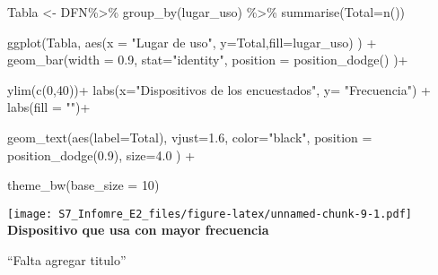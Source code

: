 \documentclass[
]{article}
\newenvironment{Shaded}{\begin{snugshade}}{\end{snugshade}}
\newcommand{\AttributeTok}[1]{\textcolor[rgb]{0.77,0.63,0.00}{#1}}
\newcommand{\DecValTok}[1]{\textcolor[rgb]{0.00,0.00,0.81}{#1}}
\newcommand{\FloatTok}[1]{\textcolor[rgb]{0.00,0.00,0.81}{#1}}
\newcommand{\FunctionTok}[1]{\textcolor[rgb]{0.00,0.00,0.00}{#1}}
\newcommand{\NormalTok}[1]{#1}
\newcommand{\OtherTok}[1]{\textcolor[rgb]{0.56,0.35,0.01}{#1}}
\newcommand{\SpecialCharTok}[1]{\textcolor[rgb]{0.00,0.00,0.00}{#1}}
\newcommand{\StringTok}[1]{\textcolor[rgb]{0.31,0.60,0.02}{#1}}
\begin{document}
\begin{Shaded}
\begin{Highlighting}[]
\NormalTok{Tabla }\OtherTok{\textless{}{-}}\NormalTok{ DFN}\SpecialCharTok{\%\textgreater{}\%} \FunctionTok{group\_by}\NormalTok{(lugar\_uso) }\SpecialCharTok{\%\textgreater{}\%} \FunctionTok{summarise}\NormalTok{(}\AttributeTok{Total=}\FunctionTok{n}\NormalTok{())   }
    
\FunctionTok{ggplot}\NormalTok{(Tabla, }\FunctionTok{aes}\NormalTok{(}\AttributeTok{x =} \StringTok{"Lugar de uso"}\NormalTok{, }\AttributeTok{y=}\NormalTok{Total,}\AttributeTok{fill=}\NormalTok{lugar\_uso) ) }\SpecialCharTok{+}    
  \FunctionTok{geom\_bar}\NormalTok{(}\AttributeTok{width =} \FloatTok{0.9}\NormalTok{, }\AttributeTok{stat=}\StringTok{"identity"}\NormalTok{,              }
           \AttributeTok{position =} \FunctionTok{position\_dodge}\NormalTok{()                 )}\SpecialCharTok{+}  
  
  \FunctionTok{ylim}\NormalTok{(}\FunctionTok{c}\NormalTok{(}\DecValTok{0}\NormalTok{,}\DecValTok{40}\NormalTok{))}\SpecialCharTok{+}
  \FunctionTok{labs}\NormalTok{(}\AttributeTok{x=}\StringTok{"Dispositivos de los encuestados"}\NormalTok{, }\AttributeTok{y=} \StringTok{"Frecuencia"}\NormalTok{) }\SpecialCharTok{+}   
  \FunctionTok{labs}\NormalTok{(}\AttributeTok{fill =} \StringTok{""}\NormalTok{)}\SpecialCharTok{+}                                         
  
  \FunctionTok{geom\_text}\NormalTok{(}\FunctionTok{aes}\NormalTok{(}\AttributeTok{label=}\NormalTok{Total), }\AttributeTok{vjust=}\FloatTok{1.6}\NormalTok{, }\AttributeTok{color=}\StringTok{"black"}\NormalTok{,    }
              \AttributeTok{position =} \FunctionTok{position\_dodge}\NormalTok{(}\FloatTok{0.9}\NormalTok{),  }\AttributeTok{size=}\FloatTok{4.0}
\NormalTok{            ) }\SpecialCharTok{+}                                            
  
  \FunctionTok{theme\_bw}\NormalTok{(}\AttributeTok{base\_size =} \DecValTok{10}\NormalTok{)}
\end{Highlighting}
\end{Shaded}

\texttt{[image: S7\_Infomre\_E2\_files/figure-latex/unnamed-chunk-9-1.pdf]}
\textbf{Dispositivo que usa con mayor frecuencia}

``Falta agregar titulo''
\end{document}
